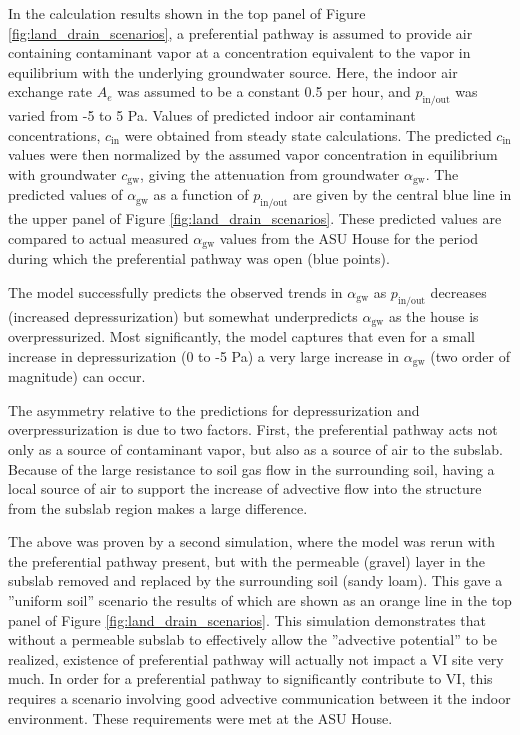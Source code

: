 \documentclass[preprint,12pt]{elsarticle}
\begin{document}
In the calculation results shown in the top panel of Figure \ref{fig:land_drain_scenarios}, a preferential pathway is assumed to provide air containing contaminant vapor at a concentration equivalent to the vapor in equilibrium with the underlying groundwater source.
Here, the indoor air exchange rate $A_e$ was assumed to be a constant 0.5 per hour, and $p_\mathrm{in/out}$ was varied from -5 to 5 Pa.
Values of predicted indoor air contaminant concentrations, $c_\mathrm{in}$ were obtained from steady state calculations.
The predicted $c_\mathrm{in}$ values were then normalized by the assumed vapor concentration in equilibrium with groundwater $c_\mathrm{gw}$, giving the attenuation from groundwater $\alpha_\mathrm{gw}$.
The predicted values of $\alpha_\mathrm{gw}$ as a function of $p_\mathrm{in/out}$ are given by the central blue line in the upper panel of Figure \ref{fig:land_drain_scenarios}.
These predicted values are compared to actual measured $\alpha_\mathrm{gw}$ values from the ASU House for the period during which the preferential pathway was open (blue points).\par

The model successfully predicts the observed trends in $\alpha_\mathrm{gw}$ as $p_\mathrm{in/out}$ decreases (increased depressurization) but somewhat underpredicts $\alpha_\mathrm{gw}$ as the house is overpressurized.
Most significantly, the model captures that even for a small increase in depressurization (0 to -5 Pa) a very large increase in $\alpha_\mathrm{gw}$ (two order of magnitude) can occur.\par

The asymmetry relative to the predictions for depressurization and overpressurization is due to two factors.
First, the preferential pathway acts not only as a source of contaminant vapor, but also  as a source of air to the subslab.
Because of the large resistance to soil gas flow in the surrounding soil, having a local source of air to support the increase of advective flow into the structure from the subslab region makes a large difference.\par

The above was proven by a second simulation, where the model was rerun with the preferential pathway present, but with the permeable (gravel) layer in the subslab removed and replaced by the surrounding soil (sandy loam).
This gave a ”uniform soil” scenario the results of which are shown as an orange line in the top panel of Figure \ref{fig:land_drain_scenarios}.
This simulation demonstrates that without a permeable subslab to effectively allow the ”advective potential” to be realized, existence of preferential pathway will actually not impact a VI site very much.
In order for a preferential pathway to significantly contribute to VI, this requires a scenario involving good advective communication between it the indoor environment.
These requirements were met at the ASU House.\par
\end{document}
